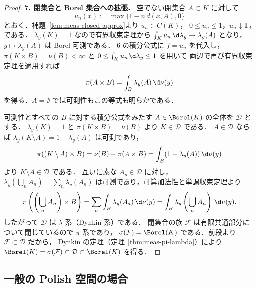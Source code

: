 \begin{proof}
  \textbf{7. 閉集合と Borel 集合への拡張．}
  空でない閉集合 $A\subset K$ に対して
  \[
    u_n(x):=\max\{1-n\,d(x,A),0\}
  \]
  とおく．補題~\ref{lem:meas-closed-approx}より $u_n\in C(K)$，
  $0\leq u_n\leq1$，$u_n\downarrow\mathbf{1}_A$ である．
  $\lambda_y(K)=1$ なので有界収束定理から
  $\int_Ku_n\,\d\lambda_y\to\lambda_y(A)$ となり，$y\mapsto\lambda_y(A)$ は Borel 可測である．
  6 の積分公式に $f=u_n$ を代入し，
  $\pi(K\times B)=\nu(B)<\infty$ と $0\leq\int_Ku_n\,\d\lambda_y\leq1$ を用いて
  両辺で再び有界収束定理を適用すれば
  \[
    \pi(A\times B)=\int_B\lambda_y(A)\,\d\nu(y)
  \]
  を得る．$A=\emptyset$ では可測性もこの等式も明らかである．

  可測性とすべての $B$ に対する積分公式をみたす $A\in\Borel(K)$ の全体を $\mathcal{D}$ とする．
  $\lambda_y(K)=1$ と $\pi(K\times B)=\nu(B)$ より $K\in\mathcal{D}$ である．
  $A\in\mathcal{D}$ ならば $\lambda_y(K\setminus A)=1-\lambda_y(A)$ は可測であり，
  \[
    \pi((K\setminus A)\times B)
    =\nu(B)-\pi(A\times B)=\int_B(1-\lambda_y(A))\,\d\nu(y)
  \]
  より $K\setminus A\in\mathcal{D}$ である．
  互いに素な $A_n\in\mathcal{D}$ に対し，
  $\lambda_y(\bigcup_nA_n)=\sum_n\lambda_y(A_n)$ は可測であり，可算加法性と単調収束定理より
  \[
    \pi\left(\left(\bigcup_nA_n\right)\times B\right)
    =\sum_n\int_B\lambda_y(A_n)\,\d\nu(y)
    =\int_B\lambda_y\left(\bigcup_nA_n\right)\,\d\nu(y).
  \]
  したがって $\mathcal{D}$ は $\lambda$-系（Dynkin 系）である．
  閉集合の族 $\mathcal{F}$ は有限共通部分について閉じているので $\pi$-系であり，
  $\sigma(\mathcal{F})=\Borel(K)$ である．前段より $\mathcal{F}\subset\mathcal{D}$ だから，
  Dynkin の定理（定理~\ref{thm:meas-pi-lambda}）により
  $\Borel(K)=\sigma(\mathcal{F})\subset\mathcal{D}\subset\Borel(K)$ を得る．
\end{proof}

\subsection{一般の Polish 空間の場合}

